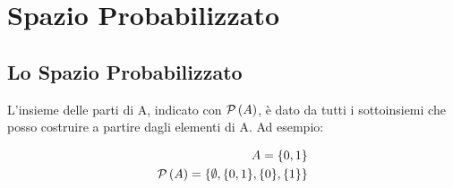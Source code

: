 \chapter{Spazio Probabilizzato}

\section{Lo Spazio Probabilizzato}


\begin{defn}
	L'insieme delle parti di A, indicato con $ \mathcal{P}\left(A\right)$, \`e dato da tutti i sottoinsiemi che posso costruire a partire dagli elementi di A. Ad esempio:

	\begin{equation*}
		\begin{aligned}
			A = \{0, 1\} \\
			\mathcal{P}\left(A\right) = \{\emptyset, \{0, 1\}, \{0\}, \{1\}\}
		\end{aligned}
	\end{equation*}
\end{defn}

